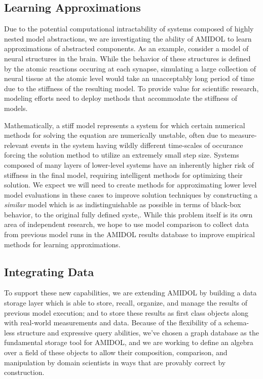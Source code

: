 \documentclass[12pt]{galois-whitepaper}
\begin{document}
\subsection{Learning Approximations}

Due to the potential computational intractability of systems composed
of highly nested model abstractions, we are investigating the ability
of AMIDOL to learn approximations of abstracted components.  As an
example, consider a model of neural structures in the brain.  While
the behavior of these structures is defined by the atomic reactions
occuring at each synapse, simulating a large collection of neural
tissue at the atomic level would take an unacceptably long period of
time due to the stiffness of the resulting model.  To provide value
for scientific research, modeling efforts need to deploy methods that
accommodate the stiffness of models.

Mathematically, a stiff model represents a system for which certain
numerical methods for solving the equation are numerically unstable,
often due to measure-relevant events in the system having wildly
different time-scales of occurance forcing the solution method to
utilize an extremely small step size.  Systems composed of many layers
of lower-level systems have an inherently higher risk of stiffness in
the final model, requiring intelligent methods for optimizing their solution.
We expect we will need to create methods for approximating lower level
model evaluations in these cases to improve solution techniques by
constructing a \emph{similar} model which is as indistinguishable as
possible in terms of black-box behavior, to the original fully defined syste,.
While this problem itself is its own area of independent research, we
hope to use model comparison to collect data from previous model runs
in the AMIDOL results database to improve empirical methods for
learning approximations.

\subsection{Integrating Data}

To support these new capabilities, we are extending AMIDOL by building
a data storage layer which is able to store, recall, organize, and
manage the results of previous model execution; and to store these
results as first class objects along with real-world measurements and data.
Because of the flexibility of a schema-less structure and expressive
query abilities, we’ve chosen a graph database as the fundamental
storage tool for AMIDOL, and we are working to define an algebra over
a field of these objects to allow their composition, comparison, and
manipulation by domain scientists in ways that are provably correct by construction.
\end{document}
